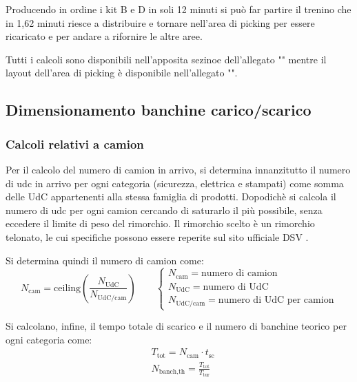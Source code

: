 \documentclass[11pt]{article}
\begin{document}
Producendo in ordine i kit B e D in soli 12 minuti si può far partire il trenino che in 1,62 minuti riesce a distribuire e tornare nell'area di picking per essere ricaricato e per andare a rifornire le altre aree.

Tutti i calcoli sono disponibili nell'apposita sezinoe dell'allegato "" mentre il layout dell'area di picking è disponibile nell'allegato "".

\newpage

\subsection{Dimensionamento banchine carico/scarico}
\subsubsection{Calcoli relativi a camion}
Per il calcolo del numero di camion in arrivo, si determina innanzitutto il numero di udc in arrivo per ogni categoria (sicurezza, elettrica e stampati) come somma delle UdC appartenenti alla stessa famiglia di prodotti.
Dopodichè si calcola il numero di udc per ogni camion cercando di saturarlo il più possibile, senza eccedere il limite di peso del rimorchio.
Il rimorchio scelto è un rimorchio telonato, le cui specifiche possono essere reperite sul sito ufficiale DSV \cite{dsv_trailer}.

\vskip1cm
\noindent
Si determina quindi il numero di camion come:
\begin{equation}
    N_\text{cam} = \text{ceiling}\left(\frac{N_\text{UdC}}{N_\text{UdC/cam}}\right)
    \qquad
    \begin{cases}
        N_\text{cam} = \text{numero di camion} \\
        N_\text{UdC} = \text{numero di UdC} \\
        N_\text{UdC/cam} = \text{numero di UdC per camion}
    \end{cases}
\end{equation}

\noindent
Si calcolano, infine, il tempo totale di scarico e il numero di banchine teorico per ogni categoria come:
\begin{align}
    & T_\text{tot} = N_\text{cam} \cdot t_\text{sc} \\
    & N_\text{banch,th} = \frac{T_\text{tot}}{T_\text{tur}}
\end{align}
\end{document}
